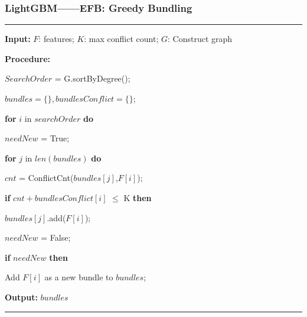 \documentclass[usenames,dvipsnames]{beamer}
\begin{document}
\begin{frame}
\frametitle{LightGBM——EFB: Greedy Bundling}
  \noindent\rule[0.10\baselineskip]{\textwidth}{0.75pt}\par
      \textbf{Input:} $F$: features; $K$: max conflict count; $G$: Construct graph\par
      \textbf{Procedure:}\par
      \hspace*{32pt}  $SearchOrder$ = G.sortByDegree();\par
      \hspace*{32pt}  $bundles = \{\}$,\,$bundlesConflict = \{\}$;\par
      \hspace*{48pt}  \textbf{for} $i$ in $searchOrder$ \textbf{do}\par
      \hspace*{64pt}  $needNew$ = True;\par
      \hspace*{64pt}  \textbf{for} $j$ in $len(bundles)$ \textbf{do}\par
      \hspace*{80pt}  $cnt$ = ConflictCnt($bundles[j]$,$F[i]$);\par
      \hspace*{80pt}  \textbf{if} $cnt+bundlesConflict[i]$ $\leq$ K \textbf{then}\par
      \hspace*{96pt}  $bundles[j]$.add($F[i]$);\par
      \hspace*{96pt}  $needNew$ = False;\par
      \hspace*{64pt}  \textbf{if} $needNew$ \textbf{then}\par
      \hspace*{80pt}  Add $F[i]$ as a new bundle to $bundles$;\par
      \textbf{Output:} $bundles$\par
  \noindent\rule[0.10\baselineskip]{\textwidth}{0.75pt}
\end{frame}
\end{document}
